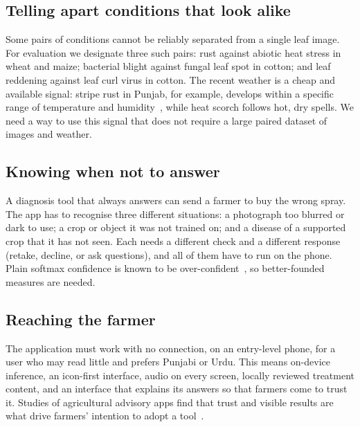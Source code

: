 \subsection{Telling apart conditions that look alike}
\label{sec:pairs}
Some pairs of conditions cannot be reliably separated from a single leaf image. For evaluation we designate three such pairs: rust against abiotic heat stress in wheat and maize; bacterial blight against fungal leaf spot in cotton; and leaf reddening against leaf curl virus in cotton. The recent weather is a cheap and available signal: stripe rust in Punjab, for example, develops within a specific range of temperature and humidity~\cite{ali2023striperust}, while heat scorch follows hot, dry spells. We need a way to use this signal that does not require a large paired dataset of images and weather.

\subsection{Knowing when not to answer}
A diagnosis tool that always answers can send a farmer to buy the wrong spray. The app has to recognise three different situations: a photograph too blurred or dark to use; a crop or object it was not trained on; and a disease of a supported crop that it has not seen. Each needs a different check and a different response (retake, decline, or ask questions), and all of them have to run on the phone. Plain softmax confidence is known to be over-confident~\cite{guo2017calibration}, so better-founded measures are needed.

\subsection{Reaching the farmer}
The application must work with no connection, on an entry-level phone, for a user who may read little and prefers Punjabi or Urdu. This means on-device inference, an icon-first interface, audio on every screen, locally reviewed treatment content, and an interface that explains its answers so that farmers come to trust it. Studies of agricultural advisory apps find that trust and visible results are what drive farmers' intention to adopt a tool~\cite{soodan2024adoption}.

